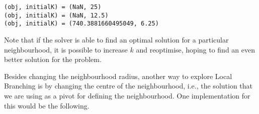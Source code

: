 \documentclass[11pt]{article}
\begin{document}
    \begin{Verbatim}[commandchars=\\\{\}]
(obj, initialK) = (NaN, 25)
(obj, initialK) = (NaN, 12.5)
(obj, initialK) = (740.3881660495049, 6.25)

    \end{Verbatim}

    Note that if the solver is able to find an optimal solution for a
particular neighbourhood, it is possible to increase \(k\) and
reoptimise, hoping to find an even better solution for the problem.

Besides changing the neighbourhood radius, another way to explore Local
Branching is by changing the centre of the neighbourhood, i.e., the
solution that we are using as a pivot for defining the neighbourhood.
One implementation for this would be the following.
\end{document}
